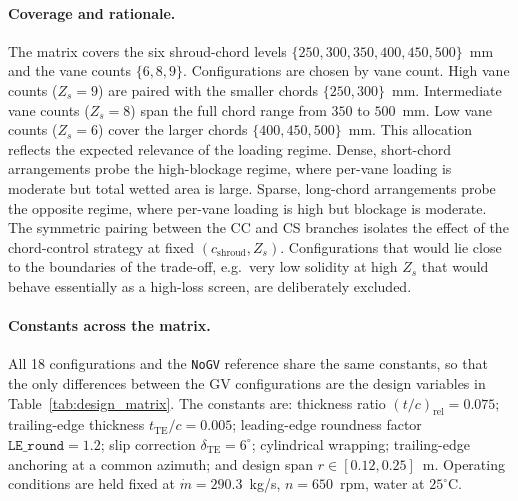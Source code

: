 \paragraph{Coverage and rationale.}
The matrix covers the six shroud-chord levels $\{250, 300, 350, 400, 450, 500\}$~mm and the vane counts $\{6, 8, 9\}$. Configurations are chosen by vane count. High vane counts ($Z_s = 9$) are paired with the smaller chords $\{250, 300\}$~mm. Intermediate vane counts ($Z_s = 8$) span the full chord range from $350$ to $500$~mm. Low vane counts ($Z_s = 6$) cover the larger chords $\{400, 450, 500\}$~mm. This allocation reflects the expected relevance of the loading regime. Dense, short-chord arrangements probe the high-blockage regime, where per-vane loading is moderate but total wetted area is large. Sparse, long-chord arrangements probe the opposite regime, where per-vane loading is high but blockage is moderate. The symmetric pairing between the CC and CS branches isolates the effect of the chord-control strategy at fixed $(c_{\mathrm{shroud}}, Z_s)$. Configurations that would lie close to the boundaries of the trade-off, e.g.\ very low solidity at high $Z_s$ that would behave essentially as a high-loss screen, are deliberately excluded.
 
\paragraph{Constants across the matrix.}
All 18 configurations and the \texttt{NoGV} reference share the same constants, so that the only differences between the GV configurations are the design variables in Table~\ref{tab:design_matrix}. The constants are: thickness ratio $(t/c)_{\mathrm{rel}} = 0.075$; trailing-edge thickness $t_{\mathrm{TE}}/c = 0.005$; leading-edge roundness factor $\texttt{LE\_round} = 1.2$; slip correction $\delta_{\mathrm{TE}} = 6^\circ$; cylindrical wrapping; trailing-edge anchoring at a common azimuth; and design span $r \in [0.12, 0.25]$~m. Operating conditions are held fixed at $\dot m = 290.3$~kg/s, $n = 650$~rpm, water at $25^\circ$C.

